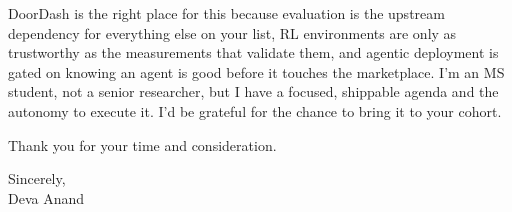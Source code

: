 \documentclass[letterpaper,11pt]{article}
\begin{document}
DoorDash is the right place for this because evaluation is the upstream dependency for everything else on your list, RL environments are only as trustworthy as the measurements that validate them, and agentic deployment is gated on knowing an agent is good before it touches the marketplace. I'm an MS student, not a senior researcher, but I have a focused, shippable agenda and the autonomy to execute it. I'd be grateful for the chance to bring it to your cohort.

\vspace{4pt}
Thank you for your time and consideration.

\vspace{8pt}
Sincerely, \\
Deva Anand
\end{document}
